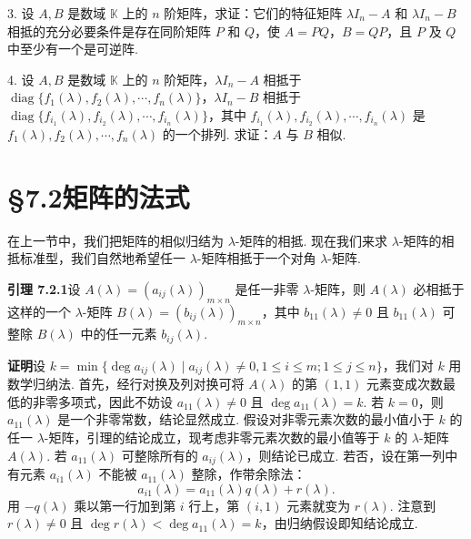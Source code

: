 \documentclass[UTF8,12pt,a4paper,fontset=fandol]{ctexart}
\begin{document}
3. 设 $A,B$ 是数域 $\mathbb{K}$ 上的 $n$ 阶矩阵，求证：它们的特征矩阵 $\lambda I_n-A$ 和 $\lambda I_n-B$ 相抵的充分必要条件是存在同阶矩阵 $P$ 和 $Q$，使 $A=PQ$，$B=QP$，且 $P$ 及 $Q$ 中至少有一个是可逆阵.

4. 设 $A,B$ 是数域 $\mathbb{K}$ 上的 $n$ 阶矩阵，$\lambda I_n-A$ 相抵于 $\operatorname{diag}\{f_1(\lambda),f_2(\lambda),\cdots,f_n(\lambda)\}$，$\lambda I_n-B$ 相抵于 $\operatorname{diag}\{f_{i_1}(\lambda),f_{i_2}(\lambda),\cdots,f_{i_n}(\lambda)\}$，其中 $f_{i_1}(\lambda),f_{i_2}(\lambda),\cdots,f_{i_n}(\lambda)$ 是 $f_1(\lambda),f_2(\lambda),\cdots,f_n(\lambda)$ 的一个排列. 求证：$A$ 与 $B$ 相似.

\section*{§7.2\quad 矩阵的法式}

在上一节中，我们把矩阵的相似归结为 $\lambda$-矩阵的相抵. 现在我们来求 $\lambda$-矩阵的相抵标准型，我们自然地希望任一 $\lambda$-矩阵相抵于一个对角 $\lambda$-矩阵.

\noindent\textbf{引理 7.2.1}\quad 设 $A(\lambda)=(a_{ij}(\lambda))_{m\times n}$ 是任一非零 $\lambda$-矩阵，则 $A(\lambda)$ 必相抵于这样的一个 $\lambda$-矩阵 $B(\lambda)=(b_{ij}(\lambda))_{m\times n}$，其中 $b_{11}(\lambda)\neq 0$ 且 $b_{11}(\lambda)$ 可整除 $B(\lambda)$ 中的任一元素 $b_{ij}(\lambda)$.

\noindent\textbf{证明}\quad 设 $k=\min\{\deg a_{ij}(\lambda)\mid a_{ij}(\lambda)\neq 0,1\leq i\leq m;1\leq j\leq n\}$，我们对 $k$ 用数学归纳法. 首先，经行对换及列对换可将 $A(\lambda)$ 的第 $(1,1)$ 元素变成次数最低的非零多项式，因此不妨设 $a_{11}(\lambda)\neq 0$ 且 $\deg a_{11}(\lambda)=k$. 若 $k=0$，则 $a_{11}(\lambda)$ 是一个非零常数，结论显然成立. 假设对非零元素次数的最小值小于 $k$ 的任一 $\lambda$-矩阵，引理的结论成立，现考虑非零元素次数的最小值等于 $k$ 的 $\lambda$-矩阵 $A(\lambda)$. 若 $a_{11}(\lambda)$ 可整除所有的 $a_{ij}(\lambda)$，则结论已成立. 若否，设在第一列中有元素 $a_{i1}(\lambda)$ 不能被 $a_{11}(\lambda)$ 整除，作带余除法：
\[
a_{i1}(\lambda)=a_{11}(\lambda)q(\lambda)+r(\lambda).
\]
用 $-q(\lambda)$ 乘以第一行加到第 $i$ 行上，第 $(i,1)$ 元素就变为 $r(\lambda)$. 注意到 $r(\lambda)\neq 0$ 且 $\deg r(\lambda)<\deg a_{11}(\lambda)=k$，由归纳假设即知结论成立.
\end{document}
